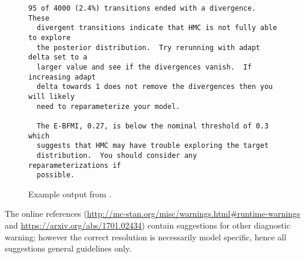 \begin{figure}
\begin{Verbatim}[fontsize=\footnotesize]
  95 of 4000 (2.4%) transitions ended with a divergence.  These
  divergent transitions indicate that HMC is not fully able to explore
  the posterior distribution.  Try rerunning with adapt delta set to a
  larger value and see if the divergences vanish.  If increasing adapt
  delta towards 1 does not remove the divergences then you will likely
  need to reparameterize your model.

  The E-BFMI, 0.27, is below the nominal threshold of 0.3 which
  suggests that HMC may have trouble exploring the target
  distribution.  You should consider any reparameterizations if
  possible.
\end{Verbatim}
\caption{Example output from .}
\label{bin-diagnose-eg.figure}
\end{figure}

The online references (\url{http://mc-stan.org/misc/warnings.html#runtime-warnings}
and \url{https://arxiv.org/abs/1701.02434}) contain suggestions for
other diagnostic warning; however the correct resolution is
necessarily model specific, hence all suggestions general guidelines only.
